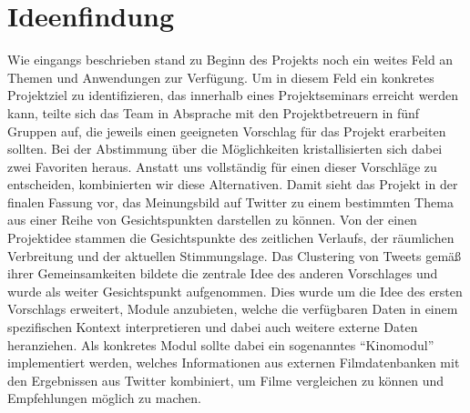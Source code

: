 \section{Ideenfindung}

Wie eingangs beschrieben stand zu Beginn des Projekts noch ein weites Feld an Themen und Anwendungen zur Verfügung. 
Um in diesem Feld ein konkretes Projektziel zu identifizieren, das innerhalb eines Projektseminars erreicht werden kann, teilte sich das Team in Absprache mit den Projektbetreuern in fünf Gruppen auf, die jeweils einen geeigneten Vorschlag für das Projekt erarbeiten sollten. 
Bei der Abstimmung über die Möglichkeiten kristallisierten sich dabei zwei Favoriten heraus. 
Anstatt uns vollständig für einen dieser Vorschläge zu entscheiden, kombinierten wir diese Alternativen. Damit sieht das Projekt in der finalen Fassung vor, das Meinungsbild auf Twitter zu einem bestimmten Thema aus einer Reihe von Gesichtspunkten darstellen zu können. 
Von der einen Projektidee stammen die Gesichtspunkte des zeitlichen Verlaufs, der räumlichen Verbreitung und der aktuellen Stimmungslage. Das Clustering von Tweets gemäß ihrer Gemeinsamkeiten bildete die zentrale Idee des anderen Vorschlages und wurde als weiter Gesichtspunkt aufgenommen.
Dies wurde um die Idee des ersten Vorschlags erweitert, Module anzubieten, welche die verfügbaren Daten in einem spezifischen Kontext interpretieren und dabei auch weitere externe Daten heranziehen. Als konkretes Modul sollte dabei ein sogenanntes "`Kinomodul"' implementiert werden, welches Informationen aus externen Filmdatenbanken mit den Ergebnissen aus Twitter kombiniert, um Filme vergleichen zu können und Empfehlungen möglich zu machen.